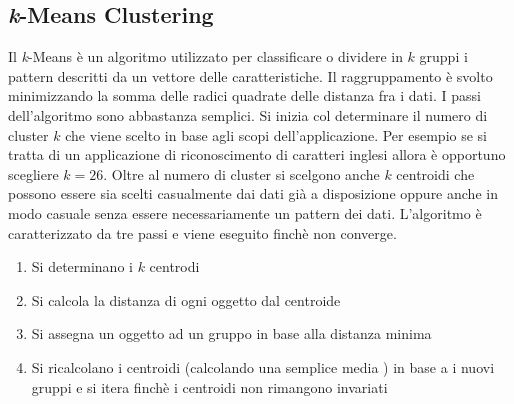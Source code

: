 \subsection{\emph{k}-Means Clustering}
Il \emph{k}-Means è un algoritmo utilizzato per classificare o dividere in $k$ gruppi i pattern descritti da un vettore delle caratteristiche. Il raggruppamento è svolto minimizzando la somma delle radici quadrate delle distanza fra i dati. I passi dell'algoritmo sono abbastanza semplici. Si inizia col determinare il numero di cluster $k$ che viene scelto in base agli scopi dell'applicazione. Per esempio se si tratta di un applicazione di riconoscimento di caratteri inglesi allora è opportuno scegliere $k=26$. Oltre al numero di cluster si scelgono anche $k$ centroidi che possono essere sia scelti casualmente dai dati già a disposizione oppure anche in modo casuale senza essere necessariamente un pattern dei dati. L'algoritmo è caratterizzato da tre passi e viene eseguito finchè non converge.

\begin{enumerate}
\item Si determinano i $k$ centrodi
\item Si calcola la distanza di ogni oggetto dal centroide
\item Si assegna un oggetto ad un gruppo in base alla distanza minima
\item Si ricalcolano i centroidi (calcolando una semplice media ) in base a i nuovi gruppi e si itera finchè i centroidi non rimangono invariati
\end{enumerate}
   
